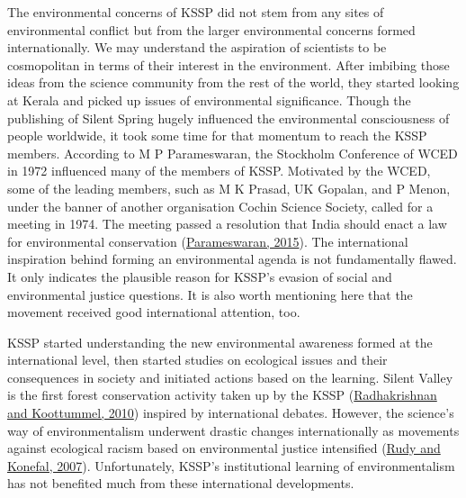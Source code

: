 \documentclass[twoside, 13pt]{article}
\begin{document}
{{{{\fontsize{12}{14}\selectfont
The environmental concerns of KSSP did not stem from any sites of environmental conflict but from the larger environmental concerns formed internationally. We may understand the aspiration of scientists to be cosmopolitan in terms of their interest in the environment. After imbibing those ideas from the science community from the rest of the world, they started looking at Kerala and picked up issues of environmental significance. Though the publishing of Silent Spring hugely influenced the environmental consciousness of people worldwide, it took some time for that momentum to reach the KSSP members. According to M P Parameswaran, the Stockholm Conference of WCED in 1972 influenced many of the members of KSSP. Motivated by the WCED, some of the leading members, such as M K Prasad, UK Gopalan, and P Menon, under the banner of another organisation Cochin Science Society, called for a meeting in 1974. The meeting passed a resolution that India should enact a law for environmental conservation (\underline{Parameswaran, 2015}). The international inspiration behind forming an environmental agenda is not fundamentally flawed. It only indicates the plausible reason for KSSP’s evasion of social and environmental justice questions. It is also worth mentioning here that the movement received good international attention, too.


KSSP started understanding the new environmental awareness formed at the international level, then started studies on ecological issues and their consequences in society and initiated actions based on the learning. Silent Valley is the first forest conservation activity taken up by the KSSP (\underline{Radhakrishnan and Koottummel, 2010}) inspired by international debates. However, the science’s way of environmentalism underwent drastic changes internationally as movements against ecological racism based on environmental justice intensified (\underline{Rudy and Konefal, 2007}). Unfortunately, KSSP's institutional learning of environmentalism has not benefited much from these international developments.} 

}}}
\end{document}
